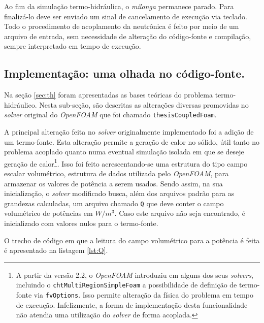 Ao fim da simulação termo-hidráulica, o \textit{milonga} permanece parado. Para finalizá-lo deve ser enviado um sinal de
cancelamento de execução via teclado. Todo o procedimento de acoplamento da neutrônica é feito por meio de um arquivo
de entrada, sem necessidade de alteração do código-fonte e compilação, sempre interpretado em tempo de execução.

\subsection{Implementação: uma olhada no código-fonte.}
\label{subsec:detth}
Na seção \ref{sec:th} foram apresentadas as bases teóricas do problema termo-hidráulico.
Nesta sub-seção, são
descritas as alterações diversas promovidas no \textit{solver} original do \textit{OpenFOAM}
que foi chamado \texttt{thesisCoupledFoam}.

A principal alteração feita no \textit{solver} originalmente implementado foi a adição de um termo-fonte.
Esta alteração permite a geração de calor no sólido, útil tanto no problema acoplado
quanto numa eventual simulação isolada em que se deseje geração de
calor\footnote{A partir da versão 2.2, o \textit{OpenFOAM} introduziu em alguns dos seus
\textit{solvers}, incluindo o \texttt{chtMultiRegionSimpleFoam} a possibilidade de definição
de termo-fonte via \texttt{fvOptions}. Isso permite alteração da física do problema em
tempo de execução. Infelizmente, a forma de implementação desta funcionalidade não atendia uma
utilização do \textit{solver} de forma acoplada.}. Isso foi feito acrescentando-se uma estrutura
do tipo campo escalar volumétrico, estrutura de dados utilizada pelo \textit{OpenFOAM},
para armazenar os valores de potência a serem usados. Sendo assim, na sua inicialização,
o \textit{solver} modificado busca, além dos arquivos padrão para as grandezas calculadas, um
arquivo chamado \texttt{Q} que deve conter o campo volumétrico de potências em $W/m^3$. Caso
este arquivo não seja encontrado, é inicializado com valores nulos para o termo-fonte.

O trecho de código em que a leitura do campo volumétrico para a potência é feita
é apresentado na listagem \ref{lst:Q}.


